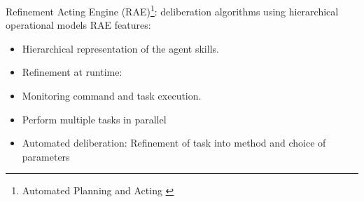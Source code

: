 \begin{frame}{Refinement Acting Engine (RAE)\footnote{Automated Planning and Acting \cite{ghallabAutomatedPlanningActing2016}}: deliberation algorithms using hierarchical operational models}
    RAE features:
    \begin{itemize}
        \item Hierarchical representation of the agent skills.
        \item Refinement at runtime:
        \centering
        \item Monitoring command and task execution.
        \item Perform multiple tasks in parallel
        \pause
        \item Automated deliberation: Refinement of task into method and choice of parameters
    \end{itemize}    
\end{frame}
    

